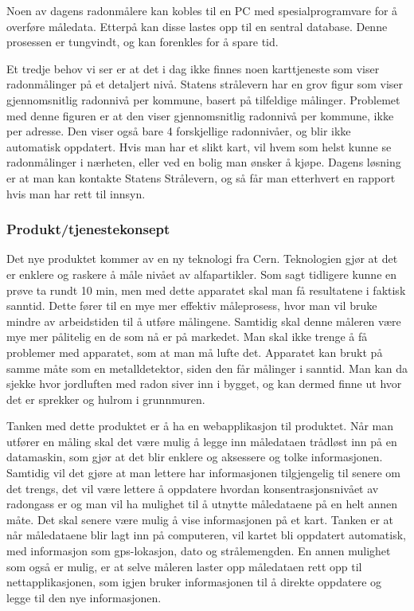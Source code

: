 Noen av dagens radonmålere kan kobles til en PC med spesialprogramvare for å overføre måledata. Etterpå kan disse lastes opp til en sentral database. Denne prosessen er tungvindt, og kan forenkles for å spare tid.

Et tredje behov vi ser er at det i dag ikke finnes noen karttjeneste som viser radonmålinger på et detaljert nivå. Statens strålevern har en grov figur som viser gjennomsnitlig radonnivå per kommune, basert på tilfeldige målinger. Problemet med denne figuren er at den viser gjennomsnitlig radonnivå per kommune, ikke per adresse. Den viser også bare 4 forskjellige radonnivåer, og blir ikke automatisk oppdatert. Hvis man har et slikt kart, vil hvem som helst kunne se radonmålinger i nærheten, eller ved en bolig man ønsker å kjøpe. Dagens løsning er at man kan kontakte Statens Strålevern, og så får man etterhvert en rapport hvis man har rett til innsyn.



\subsubsection{Produkt/tjenestekonsept}

Det nye produktet kommer av en ny teknologi fra Cern. Teknologien gjør at det er enklere og raskere å måle nivået av alfapartikler. Som sagt tidligere kunne en prøve ta rundt 10 min, men med dette apparatet skal man få resultatene i faktisk sanntid. Dette fører til en mye mer effektiv måleprosess, hvor man vil bruke mindre av arbeidstiden til å utføre målingene. Samtidig skal denne måleren være mye mer pålitelig en de som nå er på markedet. Man skal ikke trenge å få problemer med apparatet, som at man må lufte det. Apparatet kan brukt på samme måte som en metalldetektor, siden den får målinger i sanntid. Man kan da sjekke hvor jordluften med radon siver inn i bygget, og kan dermed finne ut hvor det er sprekker og hulrom i grunnmuren.

Tanken med dette produktet er å ha en webapplikasjon til produktet. Når man utfører en måling skal det være mulig å legge inn måledataen trådløst inn på en datamaskin, som gjør at det blir enklere og aksessere og tolke informasjonen. Samtidig vil det gjøre at man lettere har informasjonen tilgjengelig til senere om det trengs, det vil være lettere å oppdatere hvordan konsentrasjonsnivået av radongass er og man vil ha mulighet til å utnytte måledataene på en helt annen måte. Det skal senere være mulig å vise informasjonen på et kart. Tanken er at når måledataene blir lagt inn på computeren, vil kartet bli oppdatert automatisk, med informasjon som gps-lokasjon, dato og strålemengden. En annen mulighet som også er mulig, er at selve måleren laster opp måledataen rett opp til nettapplikasjonen, som igjen bruker informasjonen til å direkte oppdatere og legge til den nye informasjonen.
